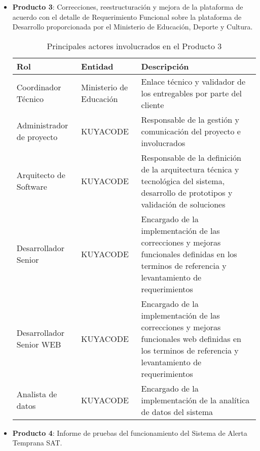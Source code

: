 \begin{itemize}
    \item \textbf{Producto 3}: Correcciones, reestructuración y mejora de la plataforma de acuerdo con el detalle de Requerimiento Funcional sobre la plataforma de Desarrollo proporcionada por el Ministerio de Educación, Deporte y Cultura.\\

    \begin{table}[h]
        \centering
        \begin{tabular}{|p{3cm}|p{5cm}|p{7cm}|}
            \hline
            \textbf{Rol} & \textbf{Entidad} & \textbf{Descripción} \\
            \hline
            Coordinador Técnico & Ministerio de Educación & Enlace técnico y validador de los entregables por parte del cliente \\
            \hline
            Administrador de proyecto & KUYACODE & Responsable de la gestión y comunicación del proyecto e involucrados \\
            \hline
            Arquitecto de Software & KUYACODE & Responsable de la definición de la arquitectura técnica y tecnológica del sistema, desarrollo de prototipos y validación de soluciones \\
            \hline
            Desarrollador Senior & KUYACODE & Encargado de la implementación de las correcciones y mejoras funcionales definidas en los terminos de referencia y levantamiento de requerimientos \\
            \hline
            Desarrollador Senior WEB & KUYACODE & Encargado de la implementación de las correcciones y mejoras funcionales web definidas en los terminos de referencia y levantamiento de requerimientos \\
            \hline
            Analista de datos & KUYACODE & Encargado de la implementación de la analítica de datos del sistema \\
            \hline
        \end{tabular}
        \caption{Principales actores involucrados en el Producto 3}
        \label{tab:actores_producto3}
        \end{table}

    \item \textbf{Producto 4}: Informe de pruebas del funcionamiento del Sistema de Alerta Temprana SAT.\\
    

\end{itemize}
